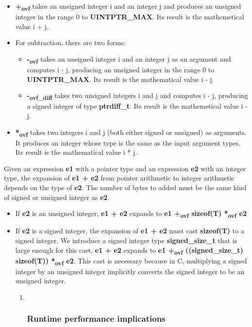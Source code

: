 \documentclass[]{article}
\begin{document}
\begin{itemize}
\item
  \textbf{+\textsubscript{ovf}} takes an unsigned integer i and an
  integer j and produces an unsigned integer in the range 0 to
  \textbf{UINTPTR\_MAX}. Its result is the mathemetical value i + j.
\item
  For subtraction, there are two forms:

  \begin{itemize}
  \item
    \textbf{-\textsubscript{ovf}} takes an unsigned integer i and an
    integer j as an argument and computes i - j, producing an unsigned
    integer in the range 0 to \textbf{UINTPTR\_MAX}. Its result is the
    mathematical value i - j.
  \item
    \textbf{-\textsubscript{ovf\_diff }}takes two unsigned integers i
    and j and computes i - j, producing a signed integer of type
    \textbf{ptrdiff\_t}. Its result is the mathemetical value i - j.
  \end{itemize}
\item
  \textbf{*\textsubscript{ovf }}takes two integers i and j (both either
  signed or unsigned) as arguments. It produces an integer whose type is
  the same as the input argument types. Its result is the mathematical
  value i * j.
\end{itemize}

Given an expression \textbf{e1} with a pointer type and an expression
\textbf{e2} with an integer type, the expansion of \textbf{e1 + e2} from
pointer arithmetic to integer arithmetic depends on the type of
\textbf{e2}. The number of bytes to added must be the same kind of
signed or unsigned integer as \textbf{e2}.

\begin{itemize}
\item
  If \textbf{e2} is an unsigned integer, \textbf{e1 + e2} expands to
  \textbf{e1 +\textsubscript{ovf} sizeof(T) *\textsubscript{ovf} e2}
\item
  If \textbf{e2} is a signed integer, the expansion of \textbf{e1 + e2}
  must cast \textbf{sizeof(T)} to a signed integer. We introduce a
  signed integer type \textbf{signed\_size\_t} that is large enough for
  this cast. \textbf{e1 + e2} expands to \textbf{e1 +\textsubscript{ovf}
  ((signed\_size\_t) sizeof(T)) *\textsubscript{ovf} e2}. This cast is
  necessary because in C, multiplying a signed integer by an unsigned
  integer implicitly converts the signed integer to be an unsigned
  integer.

  \begin{enumerate}
  \def\labelenumi{\arabic{enumi}.}
  \item ~
    \subsubsection{\texorpdfstring{\protect\hypertarget{ux5fToc440445420}{}{\protect\hypertarget{ux5fToc440449202}{}{\protect\hypertarget{ux5fToc440551852}{}{}}}Runtime
    performance
    implications}{Runtime performance implications}}\label{runtime-performance-implications}
  \end{enumerate}
\end{itemize}
\end{document}
